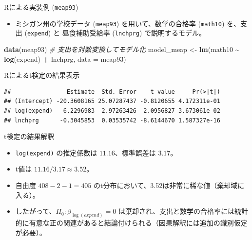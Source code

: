 \documentclass[
  ignorenonframetext,
]{beamer}
\newenvironment{Shaded}{\begin{snugshade}}{\end{snugshade}}
\newcommand{\AttributeTok}[1]{\textcolor[rgb]{0.13,0.29,0.53}{#1}}
\newcommand{\CommentTok}[1]{\textcolor[rgb]{0.56,0.35,0.01}{\textit{#1}}}
\newcommand{\FunctionTok}[1]{\textcolor[rgb]{0.13,0.29,0.53}{\textbf{#1}}}
\newcommand{\NormalTok}[1]{#1}
\newcommand{\OtherTok}[1]{\textcolor[rgb]{0.56,0.35,0.01}{#1}}
\newcommand{\SpecialCharTok}[1]{\textcolor[rgb]{0.81,0.36,0.00}{\textbf{#1}}}
\providecommand{\tightlist}{%
  \setlength{\itemsep}{0pt}\setlength{\parskip}{0pt}}
\begin{document}
\begin{frame}[fragile]{Rによる実装例 (\texttt{meap93})}
\label{rux306bux3088ux308bux5b9fux88c5ux4f8b-meap93}
\begin{itemize}
\tightlist
\item
  ミシガン州の学校データ (\texttt{meap93}) を用いて、数学の合格率
  (\texttt{math10}) を、支出 (\texttt{expend}) と 昼食補助受給率
  (\texttt{lnchprg}) で説明するモデル。
\end{itemize}

\begin{Shaded}
\begin{Highlighting}[]
\FunctionTok{data}\NormalTok{(meap93)}
\CommentTok{\# 支出を対数変換してモデル化}
\NormalTok{model\_meap }\OtherTok{\textless{}{-}} \FunctionTok{lm}\NormalTok{(math10 }\SpecialCharTok{\textasciitilde{}} \FunctionTok{log}\NormalTok{(expend) }\SpecialCharTok{+}\NormalTok{ lnchprg, }
                 \AttributeTok{data =}\NormalTok{ meap93)}
\end{Highlighting}
\end{Shaded}
\end{frame}

\begin{frame}[fragile]{Rによるt検定の結果表示}
\label{rux306bux3088ux308btux691cux5b9aux306eux7d50ux679cux8868ux793a}
\scriptsize

\begin{Shaded}
\end{Shaded}

\begin{verbatim}
##                Estimate  Std. Error    t value     Pr(>|t|)
## (Intercept) -20.3608165 25.07287437 -0.8120655 4.172311e-01
## log(expend)   6.2296983  2.97263426  2.0956827 3.673061e-02
## lnchprg      -0.3045853  0.03535742 -8.6144670 1.587327e-16
\end{verbatim}
\end{frame}

\begin{frame}[fragile]{t検定の結果解釈}
\label{tux691cux5b9aux306eux7d50ux679cux89e3ux91c8}
\begin{itemize}
\tightlist
\item
  \texttt{log(expend)} の推定係数は \(11.16\)、標準誤差は \(3.17\)。
\item
  t値は \(11.16 / 3.17 \approx 3.52\)。
\item
  自由度 \(408 - 2 - 1 = 405\)
  のt分布において、3.52は非常に稀な値（棄却域に入る）。
\item
  したがって、\(H_0: \beta_{\log(expend)} = 0\)
  は棄却され、支出と数学の合格率には統計的に有意な正の関連があると結論付けられる（因果解釈には追加の識別仮定が必要）。
\end{itemize}
\end{frame}
\end{document}
